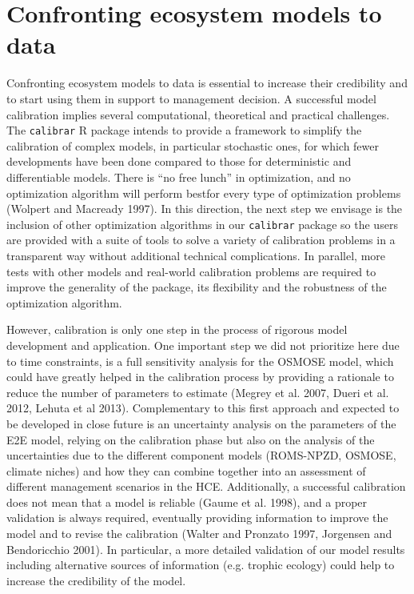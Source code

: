 
\section*{Confronting ecosystem models to data}

Confronting ecosystem models to data is essential to increase their credibility and to start using them in support to management decision. A successful model calibration implies several computational, theoretical and practical challenges. The \texttt{calibrar} R package intends to provide a framework to simplify the calibration of complex models, in particular stochastic ones, for which fewer developments have been done compared to those for deterministic and differentiable models. There is “no free lunch” in optimization, and no optimization algorithm will perform bestfor every type of optimization problems (Wolpert and Macready 1997). In this direction, the next step we envisage is the inclusion of other optimization algorithms in our \texttt{calibrar} package so the users are provided with a suite of tools to solve a variety of calibration problems in a transparent way without additional technical complications. In parallel, more tests with other models and real-world calibration problems are required to improve the generality of the package, its flexibility and the robustness of the optimization algorithm. 


However, calibration is only one step in the process of rigorous model development and application. One important step we did not prioritize here due to time constraints, is a full sensitivity analysis for the OSMOSE model, which could have greatly helped in the calibration process by providing a rationale to reduce the number of parameters to estimate (Megrey et al. 2007, Dueri et al. 2012, Lehuta et al 2013). Complementary to this first approach and expected to be developed in close future is an uncertainty analysis on the parameters of the E2E model, relying on the calibration phase but also on the analysis of the uncertainties due to the different component models (ROMS-NPZD, OSMOSE, climate niches) and how they can combine together into an assessment of different management scenarios in the HCE. Additionally, a successful calibration does not mean that a model is reliable (Gaume et al. 1998), and a proper validation is always required, eventually providing information to improve the model and to revise the calibration (Walter and Pronzato 1997, Jorgensen and Bendoricchio 2001). In particular, a more detailed validation of our model results including alternative sources of information (e.g. trophic ecology) could help to increase the credibility of the model. 

